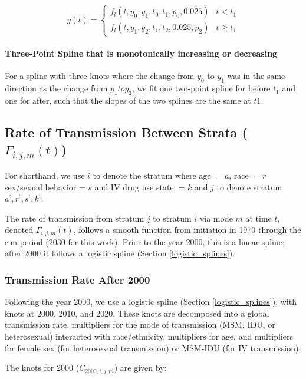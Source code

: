 \documentclass{article}
\begin{document}
\begin{equation}
y(t) = \begin{cases}
f_l(t,y_0,y_1,t_0,t_1,p_0,0.025) & t<t_1 \\
f_l(t,y_1,y_2,t_1,t_2,0.025,p_2) & t\geq t_1
\end{cases}
\end{equation}


\paragraph{Three-Point Spline that is monotonically increasing or decreasing}
For a spline with three knots where the change from $y_0$ to $y_1$ was in the same direction as the change from $y_1 to y_2$, we fit one two-point spline for before $t_1$ and one for after, such that the slopes of the two splines are the same at $t1$.

\subsection{Rate of Transmission Between Strata \big($\Gamma_{i,j,m}(t)$\big)} \label{trates}

For shorthand, we use $i$ to denote the stratum where age $=a$, race $=r$ sex/sexual behavior = $s$ and IV drug use state $=k$ and $j$ to denote stratum $a^\prime,r^\prime,s^\prime,k^\prime$.

The rate  of transmission from stratum $j$ to stratum $i$ via mode $m$ at time $t$, denoted $\Gamma_{i,j,m}(t)$, follows a smooth function from initiation in 1970 through the run period (2030 for this work). Prior to the year 2000, this is a linear spline; after 2000 it follows a logistic spline (Section \ref{logistic_splines}).

\subsubsection{Transmission Rate After 2000}

Following the year 2000, we use a logistic spline (Section \ref{logistic_splines}), with knots at 2000, 2010, and 2020. These knots are decomposed into a global transmission rate, multipliers for the mode of transmission (MSM, IDU, or heterosexual) interacted with race/ethnicity, multipliers for age, and multipliers for female sex (for heterosexual transmission) or MSM-IDU (for IV transmission).

The knots for 2000 ($C_{2000,i,j,m}$) are given by:
\end{document}
